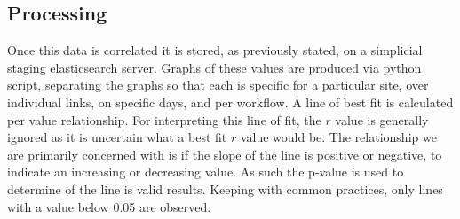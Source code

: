 \documentclass[sigconf]{acmart}
\begin{document}
\subsection{Processing}
Once this data is correlated it is stored, as previously stated, on a simplicial staging elasticsearch server. Graphs of these values are produced via python script, separating the graphs so that each is specific for a particular site, over individual links, on specific days, and per workflow. A line of best fit is calculated per value relationship. For interpreting this line of fit, the $r$ value is generally ignored as it is uncertain what a best fit $r$ value would be. The relationship we are primarily concerned with is if the slope of the line is positive or negative, to indicate an increasing or decreasing value. As such the p-value is used to determine of the line is valid results. Keeping with common practices, only lines with a value below 0.05 are observed.
\end{document}
